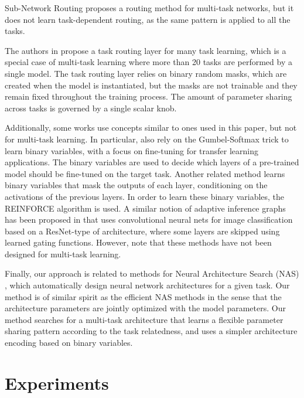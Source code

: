 \documentclass[conference]{IEEEtran}
\begin{document}
Sub-Network Routing \cite{SNR-AAAI19} proposes a routing method for multi-task networks, but it does not learn task-dependent routing, as the same pattern is applied to all the tasks.

The authors in \cite{ManyTaskLearning} propose a task routing layer for many task learning, which is a special case of multi-task learning where more than 20 tasks are performed by a single model. The task routing layer relies on binary random masks, which are created when the model is instantiated, but the masks are not trainable and they remain fixed throughout the training process. The amount of parameter sharing across tasks is governed by a single scalar knob.

Additionally, some works use concepts similar to ones used in this paper, but not for multi-task learning. In particular, \cite{SpotTune-CVPR-2018} also rely on the Gumbel-Softmax trick to learn binary variables, with a focus on fine-tuning for transfer learning applications. The binary variables are used to decide which layers of a pre-trained model should be fine-tuned on the target task.
Another related method \cite{BengBaPiPre.2016} learns binary variables that mask the outputs of each layer, conditioning on the activations of the previous layers. In order to learn these binary variables, the REINFORCE algorithm \cite{REINFORCE-1992} is used.
A similar notion of adaptive inference graphs has been proposed in \cite{ConvNet-AIG-19} that uses convolutional neural nets for image classification based on a ResNet-type of architecture, where some layers are skipped using learned gating functions.
However, note that these methods have not been designed for multi-task learning.

Finally, our approach is related to methods for Neural Architecture Search (NAS) \cite{ZophLe16,ReMoSeSaSuTaLeKu17,maziarz2018evolutionary,white2019bananas}, which automatically design neural network architectures for a given task.
Our method is of similar spirit as the efficient NAS methods \cite{ENAS,DARTS} in the sense that the architecture parameters are jointly optimized with the model parameters.
Our method searches for a multi-task architecture that learns a flexible parameter sharing pattern according to the task relatedness, and uses a simpler architecture encoding based on binary variables.

\section{Experiments}\label{sec:experiments}
\end{document}
